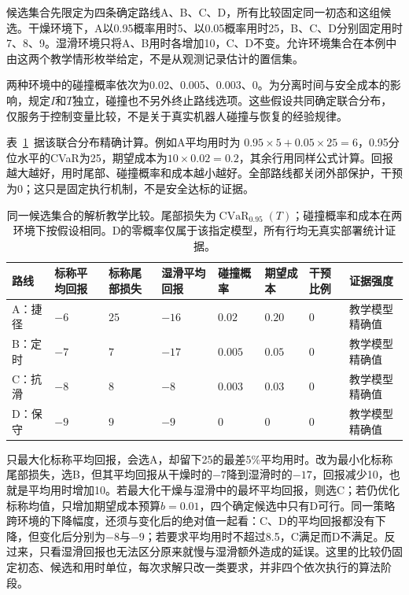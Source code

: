 候选集合先限定为四条确定路线A、B、C、D，所有比较固定同一初态和这组候选。干燥环境下，A以0.95概率用时5、以0.05概率用时25，B、C、D分别固定用时7、8、9。湿滑环境只将A、B用时各增加10，C、D不变。允许环境集合在本例中由这两个教学情形枚举给定，不是从观测记录估计的置信集。

两种环境中的碰撞概率依次为0.02、0.005、0.003、0。为分离时间与安全成本的影响，规定$I$和$T$独立，碰撞也不另外终止路线选项。这些假设共同确定联合分布，仅服务于控制变量比较，不是关于真实机器人碰撞与恢复的经验规律。

表~\ref{tab:rl-trustworthy-comparison}~据该联合分布精确计算。例如A平均用时为
$0.95\times5+0.05\times25=6$，0.95分位水平的CVaR为25，期望成本为$10\times0.02=0.2$，其余行用同样公式计算。回报越大越好，用时尾部、碰撞概率和成本越小越好。全部路线都关闭外部保护，干预为0；这只是固定执行机制，不是安全达标的证据。

\begin{table}[t]
  \centering
  \begin{tabularx}{\linewidth}{@{}>{\raggedright\arraybackslash}p{14mm}XXXXXXX@{}}
    \toprule
    路线 & 标称平均回报 & 标称尾部损失 & 湿滑平均回报 & 碰撞概率 & 期望成本 & 干预比例 & 证据强度 \\
    \midrule
    A：捷径 & $-6$ & $25$ & $-16$ & $0.02$ & $0.20$ & $0$ & 教学模型精确值 \\
    B：定时 & $-7$ & $7$ & $-17$ & $0.005$ & $0.05$ & $0$ & 教学模型精确值 \\
    C：抗滑 & $-8$ & $8$ & $-8$ & $0.003$ & $0.03$ & $0$ & 教学模型精确值 \\
    D：保守 & $-9$ & $9$ & $-9$ & $0$ & $0$ & $0$ & 教学模型精确值 \\
    \bottomrule
  \end{tabularx}
  \caption{同一候选集合的解析教学比较。尾部损失为$\operatorname{CVaR}_{0.95}(T)$；碰撞概率和成本在两环境下按假设相同。D的零概率仅属于该指定模型，所有行均无真实部署统计证据。}
  \label{tab:rl-trustworthy-comparison}
\end{table}

只最大化标称平均回报，会选A，却留下25的最差5\%平均用时。改为最小化标称尾部损失，选B，但其平均回报从干燥时的$-7$降到湿滑时的$-17$，回报减少10，也就是平均用时增加10。若最大化干燥与湿滑中的最坏平均回报，则选C；若仍优化标称均值，只增加期望成本预算$b=0.01$，四个确定候选中只有D可行。同一策略跨环境的下降幅度，还须与变化后的绝对值一起看：C、D的平均回报都没有下降，但变化后分别为$-8$与$-9$；若要求平均用时不超过8.5，C满足而D不满足。反过来，只看湿滑回报也无法区分原来就慢与湿滑额外造成的延误。这里的比较仍固定初态、候选和用时单位，每次求解只改一类要求，并非四个依次执行的算法阶段。

